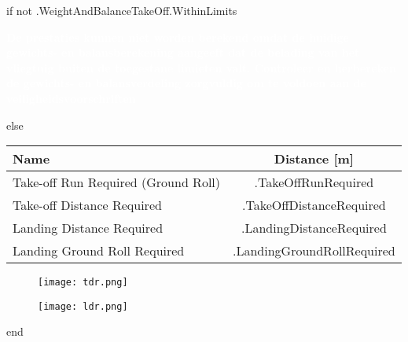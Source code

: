 \documentclass[12pt]{article}
\begin{document}
{{ if not .WeightAndBalanceTakeOff.WithinLimits }}
{\small
\noindent
\colorbox{red!80}{%
    \parbox{\textwidth}{%
        \centering
        {\textcolor{white}{\textbf{
De prestaties kunnen niet worden berekend omdat de huidige gewichts- en balansberekening aangeeft dat de belading van het vliegtuig buiten de toegestane limieten valt. Controleer en herbereken de gewichts- en balansverdeling zorgvuldig om te voldoen aan de veiligheidsvoorschriften
}}}%
    }%
}
}
{{ else }}
{\small
\begin{table}[H]
    \centering
    \renewcommand{\arraystretch}{1.5}
    \setlength{\tabcolsep}{10pt}
    \begin{tabular}{|l|c|}
        \hline
        \rowcolor[HTML]{AAAAAA}
        \textbf{Name} & \textbf{Distance [m]} \\ \hline
        Take-off Run Required (Ground Roll) & {{ .TakeOffRunRequired }} \\ \hline
        Take-off Distance Required & {{ .TakeOffDistanceRequired }} \\ \hline
        Landing Distance Required & {{ .LandingDistanceRequired }} \\ \hline
        Landing Ground Roll Required & {{ .LandingGroundRollRequired }} \\ \hline
    \end{tabular}
\end{table}
}

\newpage
\begin{figure}[H]
    \centering
    \texttt{[image: tdr.png]}
\end{figure}

\begin{figure}[H]
    \centering
    \texttt{[image: ldr.png]}
\end{figure}
{{ end }}
\end{document}
